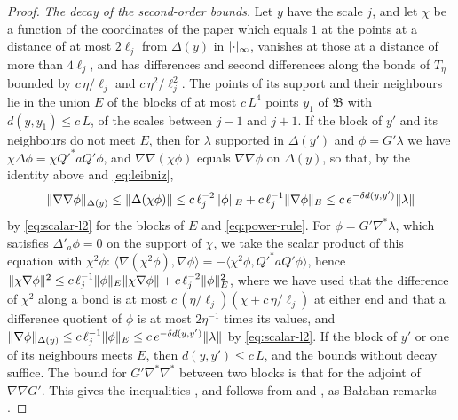 \documentclass[11pt]{preprint}
\DeclarePairedDelimiter{\abs}{\lvert}{\rvert}
\DeclarePairedDelimiter{\norm}{\lVert}{\rVert}
\numberwithin{equation}{section}
\theoremstyle{definition}
\theoremstyle{remark}
\theoremstyle{plain}
\begin{document}
\begin{proof}
\emph{The decay of the second-order bounds.} Let $y$ have the scale $j$, and let $\chi$ be a function of the coordinates of the paper which equals $1$ at the points at a distance of at most $2\ell_j$ from $\Delta(y)$ in $\abs\cdot_\infty$, vanishes at those at a distance of more than $4\ell_j$, and has differences and second differences along the bonds of $T_\eta$ bounded by $c\,\eta/\ell_j$ and $c\,\eta^2/\ell_j^2$. The points of its support and their neighbours lie in the union $E$ of the blocks of at most $c\,L^4$ points $y_1$ of $\mathfrak B$ with $d(y, y_1) \leq c\,L$, of the scales between $j - 1$ and $j + 1$. If the block of $y'$ and its neighbours do not meet $E$, then for $\lambda$ supported in $\Delta(y')$ and $\phi = G'\lambda$ we have $\chi\Delta\phi = \chi Q'^*aQ'\phi$, and $\nabla\nabla(\chi\phi)$ equals $\nabla\nabla\phi$ on $\Delta(y)$, so that, by the identity above and \eqref{eq:leibniz},
\begin{equation}\label{eq:scalar-cutoff}
    \norm{\nabla\nabla\phi}_{\Delta(y)} \leq \norm{\Delta(\chi\phi)} \leq c\,\ell_j^{-2}\norm\phi_E + c\,\ell_j^{-1}\norm{\nabla\phi}_E \leq c\,e^{-\delta d(y, y')}\norm\lambda
\end{equation}
by \eqref{eq:scalar-l2} for the blocks of $E$ and \eqref{eq:power-rule}. For $\phi = G'\nabla^*\lambda$, which satisfies $\Delta'_a\phi = 0$ on the support of $\chi$, we take the scalar product of this equation with $\chi^2\phi$: $\langle\nabla(\chi^2\phi), \nabla\phi\rangle = -\langle\chi^2\phi, Q'^*aQ'\phi\rangle$, hence $\norm{\chi\nabla\phi}^2 \leq c\,\ell_j^{-1}\norm\phi_E\norm{\chi\nabla\phi} + c\,\ell_j^{-2}\norm\phi_E^2$, where we have used that the difference of $\chi^2$ along a bond is at most $c\,(\eta/\ell_j)(\chi + c\,\eta/\ell_j)$ at either end and that a difference quotient of $\phi$ is at most $2\eta^{-1}$ times its values, and $\norm{\nabla\phi}_{\Delta(y)} \leq c\,\ell_j^{-1}\norm\phi_E \leq c\,e^{-\delta d(y, y')}\norm\lambda$ by \eqref{eq:scalar-l2}. If the block of $y'$ or one of its neighbours meets $E$, then $d(y, y') \leq c\,L$, and the bounds without decay suffice. The bound for $G'\nabla^*\nabla^*$ between two blocks is that for the adjoint of $\nabla\nabla G'$. This gives the inequalities \cite[(3.46)]{BalabanPBG}, and \cite[(3.47)]{BalabanPBG} follows from \cite[(2.67)]{BalabanPRT2} and \cite[(2.61)]{BalabanPRT2}, as Ba{\l}aban remarks \cite[p.~398]{BalabanPBG}.


\end{proof}
\end{document}
